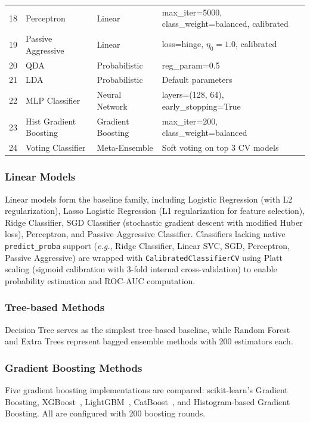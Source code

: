 \documentclass[conference,10pt]{IEEEtran}
\newcommand{\eg}{\textit{e.g.}}
\begin{document}
\begin{table}[!t]
\begin{tabular}{clll}
18 & Perceptron                & Linear           & max\_iter=5000, class\_weight=balanced, calibrated \\
19 & Passive Aggressive        & Linear           & loss=hinge, $\eta_0=1.0$, calibrated \\
20 & QDA                       & Probabilistic    & reg\_param=0.5 \\
21 & LDA                       & Probabilistic    & Default parameters \\
22 & MLP Classifier            & Neural Network   & layers=(128, 64), early\_stopping=True \\
23 & Hist Gradient Boosting    & Gradient Boosting & max\_iter=200, class\_weight=balanced \\
24 & Voting Classifier         & Meta-Ensemble    & Soft voting on top 3 CV models \\
\bottomrule
\end{tabular}
\end{table}

\subsubsection{Linear Models}
Linear models form the baseline family, including Logistic Regression (with L2 regularization), Lasso Logistic Regression (L1 regularization for feature selection), Ridge Classifier, SGD Classifier (stochastic gradient descent with modified Huber loss), Perceptron, and Passive Aggressive Classifier. Classifiers lacking native \texttt{predict\_proba} support (\eg{}, Ridge Classifier, Linear SVC, SGD, Perceptron, Passive Aggressive) are wrapped with \texttt{CalibratedClassifierCV} using Platt scaling (sigmoid calibration with 3-fold internal cross-validation) to enable probability estimation and ROC-AUC computation.

\subsubsection{Tree-based Methods}
Decision Tree serves as the simplest tree-based baseline, while Random Forest and Extra Trees represent bagged ensemble methods with 200 estimators each.

\subsubsection{Gradient Boosting Methods}
Five gradient boosting implementations are compared: scikit-learn's Gradient Boosting, XGBoost~\cite{chen2016xgboost}, LightGBM~\cite{ke2017lightgbm}, CatBoost~\cite{prokhorenkova2018catboost}, and Histogram-based Gradient Boosting. All are configured with 200 boosting rounds.
\end{document}
